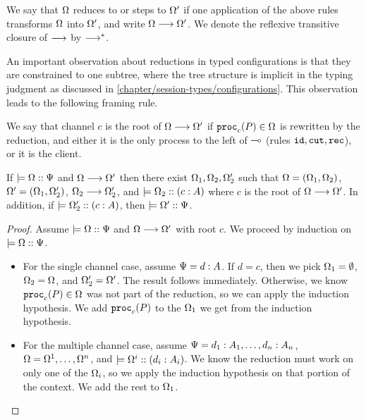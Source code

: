 We say that $\Omega$ reduces to or steps to $\Omega'$ if one application of the above rules transforms $\Omega$ into $\Omega'$, and write $\Omega \longrightarrow \Omega'$. We denote the reflexive transitive closure of $\longrightarrow$ by $\longrightarrow^*$.

An important observation about reductions in typed configurations is that they are constrained to one subtree, where the tree structure is implicit in the typing judgment as discussed in \cref{chapter/session-types/configurations}. This observation leads to the following framing rule.

\begin{definition} We say that channel $c$ is the root of $\Omega \longrightarrow \Omega'$ if $\mathtt{proc}_{c}(P) \in \Omega$ is rewritten by the reduction, and either it is the only process to the left of $\multimap$ (rules $\texttt{id}, \texttt{cut}, \texttt{rec}$), or it is the client.
\end{definition}

\begin{lemma}[Framing]
  \label{framing}
  If $\models {\Omega} :: {\Psi}$ and $\Omega \longrightarrow \Omega'$ then there exist $\Omega_1, \Omega_2, \Omega_2'$ such that $\Omega = (\Omega_1, \Omega_2)$, $\Omega' = (\Omega_1, \Omega_2')$, $\Omega_2 \longrightarrow \Omega_2'$, and $\models {\Omega_2} :: ({c} : {A})$ where $c$ is the root of $\Omega \longrightarrow \Omega'$. In addition, if $\models {\Omega_2'} :: ({c} : {A})$, then $\models {\Omega'} :: {\Psi}$.
\end{lemma}

\begin{proof}
  Assume $\models {\Omega} :: {\Psi}$ and $\Omega \longrightarrow \Omega'$ with root $c$. We proceed by induction on $\models {\Omega} :: {\Psi}$.
  \begin{itemize}
    \item For the single channel case, assume $\Psi = d : A$. If $d = c$, then we pick $\Omega_1 = \emptyset$, $\Omega_2 = \Omega$, and $\Omega_2' = \Omega'$. The result follows immediately. Otherwise, we know $\mathtt{proc}_{c}(P) \in \Omega$ was not part of the reduction, so we can apply the induction hypothesis. We add $\mathtt{proc}_{c}(P)$ to the $\Omega_1$ we get from the induction hypothesis.
    \item For the multiple channel case, assume $\Psi = d_1 : A_1, \ldots, d_n : A_n$, $\Omega = \Omega^1, \ldots, \Omega^n$, and $\models {\Omega^i} :: ({d_i} : {A_i})$. We know the reduction must work on only one of the $\Omega_i$, so we apply the induction hypothesis on that portion of the context. We add the rest to $\Omega_1$.
  \end{itemize}
\end{proof}


